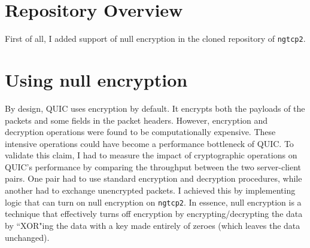 \documentclass[12pt,a4paper,twoside,openright]{report}
\begin{document}





\section{Repository Overview} 
First of all, I added support of null encryption in the cloned repository of \texttt{ngtcp2}.

\section{Using null encryption}
By design, QUIC uses encryption by default.
It encrypts both the payloads of the packets and some fields in the packet headers.
However, encryption and decryption operations were found to be computationally expensive.
These intensive operations could have become a performance bottleneck of QUIC.
To validate this claim, I had to measure the impact of cryptographic operations on QUIC's performance by comparing the throughput between the two server-client pairs.
One pair had to use standard encryption and decryption procedures, while another had to exchange unencrypted packets.
I achieved this by implementing logic that can turn on null encryption on \texttt{ngtcp2}.
In essence, null encryption is a technique that effectively turns off encryption by encrypting/decrypting the data by ``XOR"ing the data with a key made entirely of zeroes (which leaves the data unchanged). 
\end{document}
